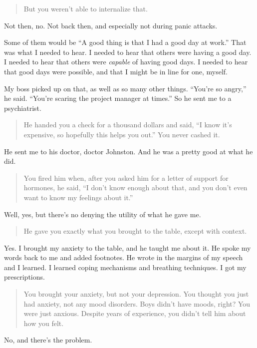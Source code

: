 \begin{quote}
But you weren't able to internalize that.
\end{quote}

Not then, no. Not back then, and especially not during panic attacks.

Some of them would be ``A good thing is that I had a good day at work.'' That was what I needed to hear. I needed to hear that others were having a good day. I needed to hear that others were \emph{capable} of having good days. I needed to hear that good days were possible, and that I might be in line for one, myself.

My boss picked up on that, as well as so many other things. ``You're so angry,'' he said. ``You're scaring the project manager at times.'' So he sent me to a psychiatrist.

\begin{quote}
He handed you a check for a thousand dollars and said, ``I know it's expensive, so hopefully this helps you out.'' You never cashed it.
\end{quote}

He sent me to his doctor, doctor Johnston. And he was a pretty good at what he did.

\begin{quote}
You fired him when, after you asked him for a letter of support for hormones, he said, ``I don't know enough about that, and you don't even want to know my feelings about it.''
\end{quote}

Well, yes, but there's no denying the utility of what he gave me.

\begin{quote}
He gave you exactly what you brought to the table, except with context.
\end{quote}

Yes. I brought my anxiety to the table, and he taught me about it. He spoke my words back to me and added footnotes. He wrote in the margins of my speech and I learned. I learned coping mechanisms and breathing techniques. I got my prescriptions.

\begin{quote}
You brought your anxiety, but not your depression. You thought you just had anxiety, not any mood disorders. Boys didn't have moods, right? You were just anxious. Despite years of experience, you didn't tell him about how you felt.
\end{quote}

No, and there's the problem.
